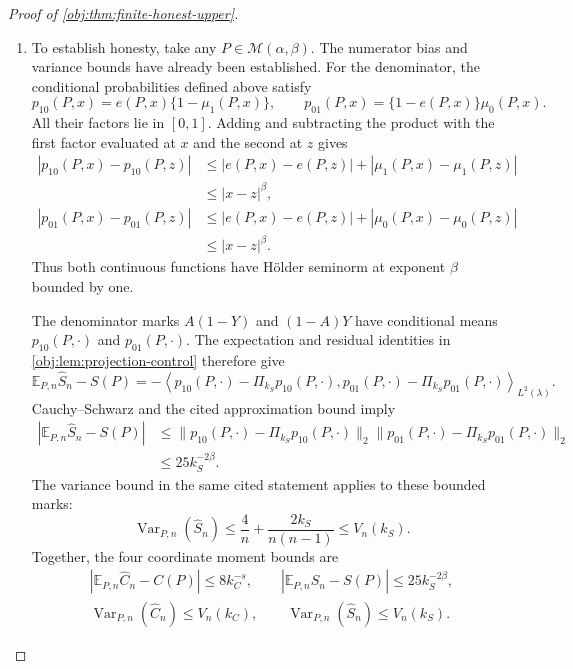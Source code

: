 \begin{proof}[Proof of \cref{obj:thm:finite-honest-upper}]
\begin{enumerate}
\item To establish honesty, take any \(P\in\mathcal M(\alpha,\beta)\).
The numerator bias and variance bounds have already been established. For the denominator, the conditional probabilities defined above satisfy
\[
p_{10}(P,x)=e(P,x)\{1-\mu_1(P,x)\},
\qquad
p_{01}(P,x)=\{1-e(P,x)\}\mu_0(P,x).
\]
All their factors lie in \([0,1]\). Adding and subtracting the product with the first factor evaluated at \(x\) and the second at \(z\) gives
\[
\begin{aligned}
|p_{10}(P,x)-p_{10}(P,z)|
&\le |e(P,x)-e(P,z)|
   +|\mu_1(P,x)-\mu_1(P,z)|\\
&\le |x-z|^\beta,\\
|p_{01}(P,x)-p_{01}(P,z)|
&\le |e(P,x)-e(P,z)|
   +|\mu_0(P,x)-\mu_0(P,z)|\\
&\le |x-z|^\beta.
\end{aligned}
\]
Thus both continuous functions have Hölder seminorm at exponent \(\beta\) bounded by one.

The denominator marks \(A(1-Y)\) and \((1-A)Y\) have conditional means \(p_{10}(P,\cdot)\) and \(p_{01}(P,\cdot)\).
The expectation and residual identities in \cref{obj:lem:projection-control} therefore give
\[
\mathbb E_{P,n}\widehat S_n-S(P)
=
-\left\langle
p_{10}(P,\cdot)-\Pi_{k_S}p_{10}(P,\cdot),
p_{01}(P,\cdot)-\Pi_{k_S}p_{01}(P,\cdot)
\right\rangle_{L^2(\lambda)}.
\]
Cauchy--Schwarz and the cited approximation bound imply
\[
\begin{aligned}
|\mathbb E_{P,n}\widehat S_n-S(P)|
&\le
\|p_{10}(P,\cdot)-\Pi_{k_S}p_{10}(P,\cdot)\|_2
\|p_{01}(P,\cdot)-\Pi_{k_S}p_{01}(P,\cdot)\|_2\\
&\le25k_S^{-2\beta}.
\end{aligned}
\]
The variance bound in the same cited statement applies to these bounded marks:
\[
\operatorname{Var}_{P,n}(\widehat S_n)
\le\frac4n+\frac{2k_S}{n(n-1)}
\le V_n(k_S).
\]
Together, the four coordinate moment bounds are
\[
\begin{gathered}
|\mathbb E_{P,n}\widehat C_n-C(P)|\le8k_C^{-s},
\qquad
|\mathbb E_{P,n}\widehat S_n-S(P)|\le25k_S^{-2\beta},\\
\operatorname{Var}_{P,n}(\widehat C_n)\le V_n(k_C),
\qquad
\operatorname{Var}_{P,n}(\widehat S_n)\le V_n(k_S).
\end{gathered}
\]


\end{enumerate}
\end{proof}
